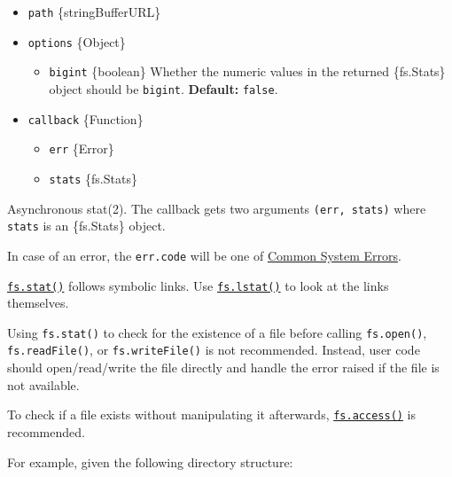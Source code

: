 \begin{itemize}
\tightlist
\item
  \texttt{path} \{string\textbar Buffer\textbar URL\}
\item
  \texttt{options} \{Object\}

  \begin{itemize}
  \tightlist
  \item
    \texttt{bigint} \{boolean\} Whether the numeric values in the
    returned \{fs.Stats\} object should be \texttt{bigint}.
    \textbf{Default:} \texttt{false}.
  \end{itemize}
\item
  \texttt{callback} \{Function\}

  \begin{itemize}
  \tightlist
  \item
    \texttt{err} \{Error\}
  \item
    \texttt{stats} \{fs.Stats\}
  \end{itemize}
\end{itemize}

Asynchronous stat(2). The callback gets two arguments
\texttt{(err,\ stats)} where \texttt{stats} is an \{fs.Stats\} object.

In case of an error, the \texttt{err.code} will be one of
\href{errors.md\#common-system-errors}{Common System Errors}.

\hyperref[fsstatpath-options-callback]{\texttt{fs.stat()}} follows
symbolic links. Use
\hyperref[fslstatpath-options-callback]{\texttt{fs.lstat()}} to look at
the links themselves.

Using \texttt{fs.stat()} to check for the existence of a file before
calling \texttt{fs.open()}, \texttt{fs.readFile()}, or
\texttt{fs.writeFile()} is not recommended. Instead, user code should
open/read/write the file directly and handle the error raised if the
file is not available.

To check if a file exists without manipulating it afterwards,
\hyperref[fsaccesspath-mode-callback]{\texttt{fs.access()}} is
recommended.

For example, given the following directory structure:

\begin{Shaded}
\begin{Highlighting}[]
\end{Highlighting}
\end{Shaded}

